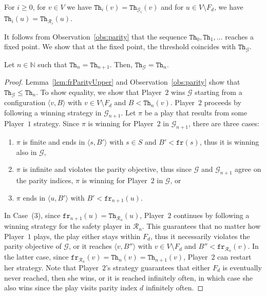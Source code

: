\documentclass{article}\providecommand{\nequiv}{\not\equiv}\usepackage[a4paper,margin=20mm]{geometry}
\newcommand{\PO}{Player~$1$\xspace}
\newcommand{\PT}{Player~$2$\xspace}
\newcommand{\G}{{\mathcal G}}
\newcommand{\R}{{\mathcal R}}
\newcommand{\fr}{\texttt{fr}}
\newcommand{\Nat}{\mathbb{N}}
\newcommand{\notFd}{V \setminus F_d}
\newcommand{\thresh}{\texttt{Th}\xspace}
\newcommand{\zug}[1]{\langle #1  \rangle}
\begin{document}
\begin{lemma}
\label{lem:frParityUpper}
For $i \geq 0$, for $v \in V$ we have $\thresh_i(v) = \thresh_{\G_i}(v)$ and for $u \in \notFd$, we have $\thresh_i(u) = \thresh_{\R_i}(u)$. 
\end{lemma}


It follows from Observation~\ref{obs:parity} that the sequence $\thresh_0,\thresh_1,\ldots$ reaches a fixed point. We show that at the fixed point, the threshold coincides with $\thresh_\G$. 

\begin{lemma}
Let $n \in \Nat$ such that $\thresh_n = \thresh_{n+1}$. Then, $\thresh_\G = \thresh_n$. 
\end{lemma}
\begin{proof}
Lemma~\ref{lem:frParityUpper} and Observation~\ref{obs:parity} show that $\thresh_\G \leq \thresh_n$. To show equality, we show that \PT wins $\G$ starting from a configuration $\zug{v, B}$ with $v \in \notFd$ and $B < \thresh_n(v)$. \PT proceeds by following a winning strategy in $\G_{n+1}$. Let $\pi$ be a play that results from some \PO strategy. Since $\pi$ is winning for \PT in $\G_{n+1}$,  there are three cases: 
\begin{enumerate}
\item $\pi$ is finite and ends in $\zug{s, B'}$ with $s \in S$ and $B' < \fr(s)$, thus it is winning also in $\G$, 
\item $\pi$ is infinite and violates the parity objective, thus since $\G$ and $\G_{n+1}$ agree on the parity indices, $\pi$ is winning for \PT in $\G$, or 
\item $\pi$ ends in $\zug{u, B'}$ with $B' < \fr_{n+1}(u)$. 
\end{enumerate}
In Case~(3), since $\fr_{n+1}(u) = \thresh_{\R_n}(u)$, \PT continues by following a winning strategy for the safety player in $\R_n$. This guarantees that no matter how \PO plays, the play either stays within $F_d$, thus it necessarily violates the parity objective of $\G$, or it reaches $\zug{v, B''}$ with $v \in \notFd$ and $B'' < \fr_{\R_n}(v)$.  In the latter case, since $\fr_{\R_n}(v) = \thresh_n(v) = \thresh_{n+1}(v)$, \PT can restart her strategy. Note that \PT's strategy guarantees that either $F_d$ is eventually never reached, then she wins, or it is reached infinitely often, in which case she also wins since the play visits parity index $d$ infinitely often. 
\end{proof}
\end{document}
